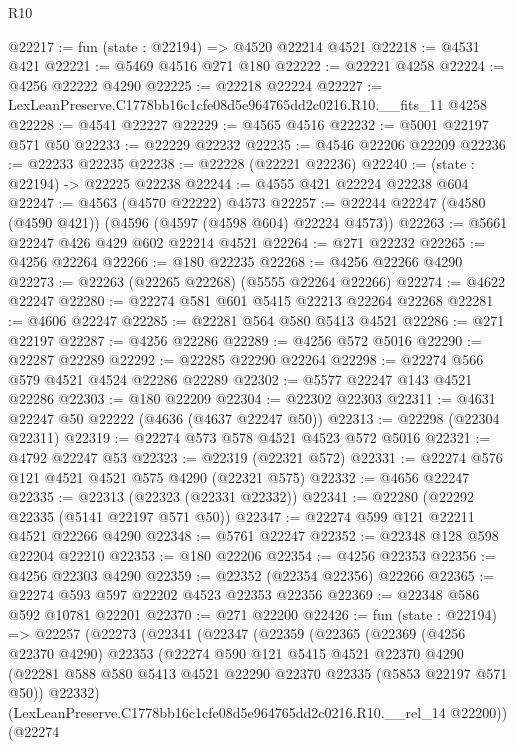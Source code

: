 \begin{lexlean}{R10}
\begin{coremodule}
@22217 := fun (state : @22194) => @4520 @22214 @4521
@22218 := @4531 @421
@22221 := @5469 @4516 @271 @180
@22222 := @22221 @4258
@22224 := @4256 @22222 @4290
@22225 := @22218 @22224
@22227 := LexLeanPreserve.C1778bb16c1cfe08d5e964765dd2c0216.R10.__fits_11 @4258
@22228 := @4541 @22227
@22229 := @4565 @4516
@22232 := @5001 @22197 @571 @50
@22233 := @22229 @22232
@22235 := @4546 @22206 @22209
@22236 := @22233 @22235
@22238 := @22228 (@22221 @22236)
@22240 := (state : @22194) -> @22225 @22238
@22244 := @4555 @421 @22224 @22238 @604
@22247 := @4563 (@4570 @22222) @4573
@22257 := @22244 @22247 (@4580 (@4590 @421)) (@4596 (@4597 (@4598 @604) @22224 @4573))
@22263 := @5661 @22247 @426 @429 @602 @22214 @4521
@22264 := @271 @22232
@22265 := @4256 @22264
@22266 := @180 @22235
@22268 := @4256 @22266 @4290
@22273 := @22263 (@22265 @22268) (@5555 @22264 @22266)
@22274 := @4622 @22247
@22280 := @22274 @581 @601 @5415 @22213 @22264 @22268
@22281 := @4606 @22247
@22285 := @22281 @564 @580 @5413 @4521
@22286 := @271 @22197
@22287 := @4256 @22286
@22289 := @4256 @572 @5016
@22290 := @22287 @22289
@22292 := @22285 @22290 @22264
@22298 := @22274 @566 @579 @4521 @4524 @22286 @22289
@22302 := @5577 @22247 @143 @4521 @22286
@22303 := @180 @22209
@22304 := @22302 @22303
@22311 := @4631 @22247 @50 @22222 (@4636 (@4637 @22247 @50))
@22313 := @22298 (@22304 @22311)
@22319 := @22274 @573 @578 @4521 @4523 @572 @5016
@22321 := @4792 @22247 @53
@22323 := @22319 (@22321 @572)
@22331 := @22274 @576 @121 @4521 @4521 @575 @4290 (@22321 @575)
@22332 := @4656 @22247
@22335 := @22313 (@22323 (@22331 @22332))
@22341 := @22280 (@22292 @22335 (@5141 @22197 @571 @50))
@22347 := @22274 @599 @121 @22211 @4521 @22266 @4290
@22348 := @5761 @22247
@22352 := @22348 @128 @598 @22204 @22210
@22353 := @180 @22206
@22354 := @4256 @22353
@22356 := @4256 @22303 @4290
@22359 := @22352 (@22354 @22356) @22266
@22365 := @22274 @593 @597 @22202 @4523 @22353 @22356
@22369 := @22348 @586 @592 @10781 @22201
@22370 := @271 @22200
@22426 := fun (state : @22194) =>
  @22257
    (@22273
      (@22341
        (@22347
          (@22359
            (@22365
              (@22369
                (@4256 @22370 @4290)
                @22353
                (@22274
                  @590
                  @121
                  @5415
                  @4521
                  @22370
                  @4290
                  (@22281 @588 @580 @5413 @4521 @22290 @22370 @22335 (@5853 @22197 @571 @50))
                  @22332)
                (LexLeanPreserve.C1778bb16c1cfe08d5e964765dd2c0216.R10.__rel_14 @22200))
              (@22274

\end{coremodule}
\end{lexlean}
